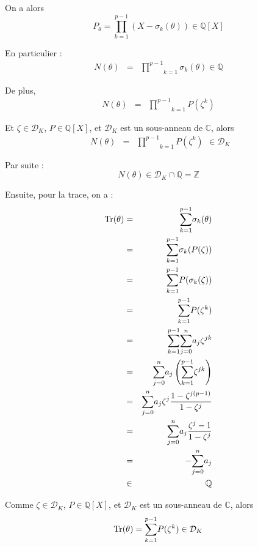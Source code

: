On a alors
\[ P_{\theta} = \underset{k = 1}{\overset{p - 1}{\prod}} (X - \sigma_k
   (\theta)) \in \mathbb{Q} [X] \]


En particulier :
\[ \begin{array}{lll}
     N (\theta) & = & \underset{k = 1}{\overset{p - 1}{\prod}} \sigma_k
     (\theta) \in \mathbb{Q}
   \end{array} \]


De plus,
\[ \begin{array}{lll}
     N (\theta) & = & \underset{k = 1}{\overset{p - 1}{\prod}} P (\zeta^k)
   \end{array} \]


Et $\zeta \in \mathcal{D}_K$, $P \in \mathbb{Q} [X]$, et $\mathcal{D}_K$ est
un sous-anneau de $\mathbb{C}$, alors
\[ \begin{array}{lll}
     N (\theta) & = & \underset{k = 1}{\overset{p - 1}{\prod}} P (\zeta^k)
   \end{array} \in \mathcal{D}_K \]


Par suite :
\[ N (\theta) \in \mathcal{D}_K \cap \mathbb{Q}=\mathbb{Z} \]


Ensuite, pour la trace, on a :
\begin{eqnarray*}
  \operatorname{Tr} (\theta) & = & \underset{k = 1}{\overset{p - 1}{\sum}} \sigma_k
  (\theta)\\
  & = & \underset{k = 1}{\overset{p - 1}{\sum}} \sigma_k (P (\zeta))\\
  & = & \underset{k = 1}{\overset{p - 1}{\sum}}  P ( \sigma_k
  ( \zeta))\\
  & = & \underset{k = 1}{\overset{p - 1}{\sum}}  P (\zeta^k)\\
  & = & \underset{k = 1}{\overset{p - 1}{\sum}}  \underset{j =
  0}{\overset{n}{\sum}} a_j \zeta^{j k}\\
  & = &  \underset{j = 0}{\overset{n}{\sum}} a_j \left( \underset{k =
  1}{\overset{p - 1}{\sum}} \zeta^{j k} \right)\\
  & = & \underset{j = 0}{\overset{n}{\sum}} a_j \zeta^j \frac{1 - \zeta^{j (p
  - 1)}}{1 - \zeta^j}\\
  & = & \underset{j = 0}{\overset{n}{\sum}} a_j \frac{\zeta^j - 1}{1 -
  \zeta^j}\\
  & = & - \underset{j = 0}{\overset{n}{\sum}} a_j\\
  & \in & \mathbb{Q}
\end{eqnarray*}


Comme $\zeta \in \mathcal{D}_K$, $P \in \mathbb{Q} [X]$, et $\mathcal{D}_K$
est un sous-anneau de $\mathbb{C}$, alors
\[ \operatorname{Tr} (\theta) = \underset{k = 1}{\overset{p - 1}{\sum}}  P (\zeta^k)
   \in \mathcal{D}_K \]


